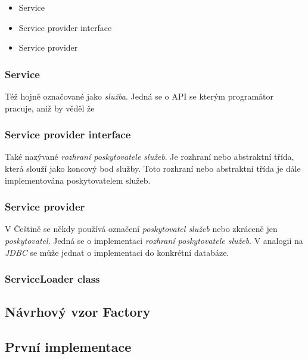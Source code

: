 \begin{itemize}
	\item Service
	\item Service provider interface
	\item Service provider
\end{itemize}	
	
\subsubsection{Service}
	Též hojně označované jako \textit{služba}. Jedná se o API se kterým programátor pracuje, aniž by věděl že 


\subsubsection{Service provider interface}
	Také nazývané \textit{rozhraní poskytovatele služeb}. Je rozhraní nebo abstraktní třída, která slouží jako koncový bod služby. Toto rozhraní nebo abstraktní třída je dále implementována poskytovatelem služeb.
	
	
\subsubsection{Service provider}
	V Češtině se někdy používá označení \textit{poskytovatel služeb} nebo zkráceně jen \textit{poskytovatel}. Jedná se o implementaci \textit{rozhraní poskytovatele služeb}. V analogii na \textit{JDBC} se může jednat o implementaci do konkrétní databáze.


\subsubsection{ServiceLoader class}




\subsection{Návrhový vzor Factory}



\subsection{První implementace}

	

